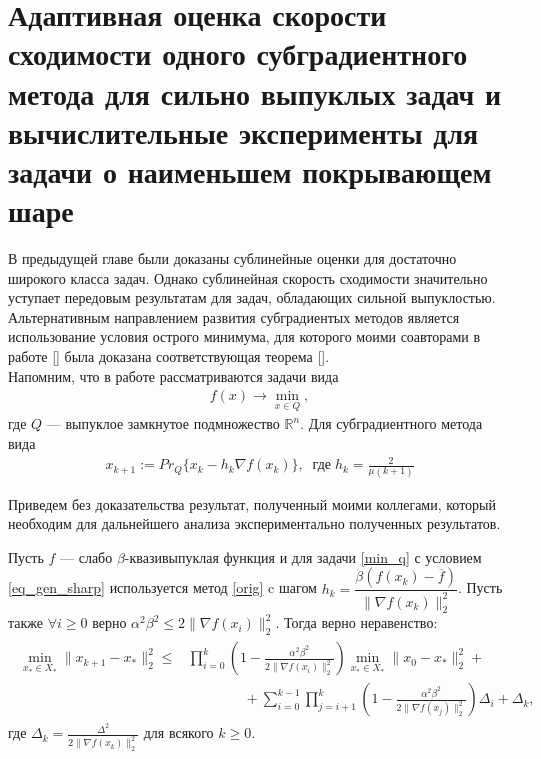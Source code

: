 \section{Адаптивная оценка скорости сходимости одного субградиентного метода для сильно выпуклых задач и вычислительные эксперименты для задачи о наименьшем покрывающем шаре}  \label{sec:ch3/sec2}

    В предыдущей главе были доказаны сублинейные оценки для достаточно широкого класса задач. Однако сублинейная скорость сходимости значительно уступает передовым результатам для задач, обладающих сильной выпуклостью. Альтернативным направлением развития субградиентых методов является использование условия острого минимума, для которого моими соавторами в работе [] была доказана соответствующая теорема [].\\  
    Напомним, что в работе рассматриваются задачи вида
    \begin{gather}\label{min_q}
        f(x)\rightarrow\min_{x\in Q},
    \end{gather}
    где $Q$ --- выпуклое замкнутое подмножество $\mathbb{R}^{n}$. Для субградиентного метода вида
    \begin{gather}\label{orig}
        x_{k+1} := Pr_{Q}\{x_k - h_k \nabla f(x_k) \}, \;\; \textit{где} \; h_k = \frac{2}{\mu (k+1)}
    \end{gather}

    Приведем без доказательства результат, полученный моими коллегами, который необходим для дальнейшего анализа экспериментально полученных результатов.
    \begin{theorem}\label{theorem1}
        Пусть $f$ --- слабо $\beta$-квазивыпуклая функция и для задачи \eqref{min_q} с условием \eqref{eq_gen_sharp} используется метод \eqref{orig} c шагом
        $h_k = \dfrac{\beta(f(x_k) - \overline{f})}{\| \nabla f(x_k) \|_2^2}$. Пусть также $\forall i \geq 0$ верно $\alpha^2 \beta^2 \leq 2 \| \nabla f(x_i) \|_2^2$. Тогда верно неравенство:
        \begin{gather}\label{adaptive_estimate}
            \begin{aligned}
            \min_{x_* \in X_*} \|x_{k+1} - x_* \|_2^2 \leq &  \prod_{i=0}^k \left ( 1 - \frac{\alpha^2\beta^2}{2 \| \nabla f(x_i) \|_2^2} \right ) \min_{x_* \in X_*} \|x_0 - x_* \|_2^2 + \\& 
            \qquad \qquad + \sum_{i=0}^{k-1} \prod_{j=i+1}^k \left ( 1 - \frac{\alpha^2\beta^2}{2 \| \nabla f(x_j) \|_2^2} \right )\Delta_i + \Delta_k,
            \end{aligned}
        \end{gather}
        где $\Delta_k = \frac{\Delta^2}{2 \| \nabla f(x_k) \|_2^2}$ для всякого $k \geqslant 0$.
    \end{theorem}

